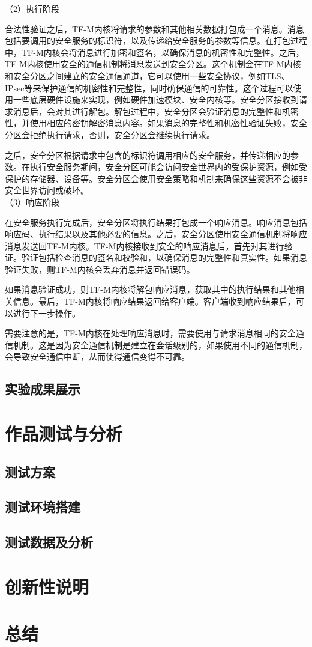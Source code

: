 \documentclass[12pt,a4paper]{ctexart}
\begin{document}
（2）执行阶段\\
\par 合法性验证之后，TF-M内核将请求的参数和其他相关数据打包成一个消息。消息包括要调用的安全服务的标识符，以及传递给安全服务的参数等信息。在打包过程中，TF-M内核会将消息进行加密和签名，以确保消息的机密性和完整性。之后，TF-M内核使用安全的通信机制将消息发送到安全分区。这个机制会在TF-M内核和安全分区之间建立的安全通信通道，它可以使用一些安全协议，例如TLS、IPsec等来保护通信的机密性和完整性，同时确保通信的可靠性。这个过程可以使用一些底层硬件设施来实现，例如硬件加速模块、安全内核等。安全分区接收到请求消息后，会对其进行解包。解包过程中，安全分区会验证消息的完整性和机密性，并使用相应的密钥解密消息内容。如果消息的完整性和机密性验证失败，安全分区会拒绝执行请求，否则，安全分区会继续执行请求。
\par 之后，安全分区根据请求中包含的标识符调用相应的安全服务，并传递相应的参数。在执行安全服务期间，安全分区可能会访问安全世界内的受保护资源，例如受保护的存储器、设备等。安全分区会使用安全策略和机制来确保这些资源不会被非安全世界访问或破坏。\\
（3）响应阶段
\par 在安全服务执行完成后，安全分区将执行结果打包成一个响应消息。响应消息包括响应码、执行结果以及其他必要的信息。之后，安全分区使用安全通信机制将响应消息发送回TF-M内核。TF-M内核接收到安全的响应消息后，首先对其进行验证。验证包括检查消息的签名和校验和，以确保消息的完整性和真实性。如果消息验证失败，则TF-M内核会丢弃消息并返回错误码。
\par 如果消息验证成功，则TF-M内核将解包响应消息，获取其中的执行结果和其他相关信息。最后，TF-M内核将响应结果返回给客户端。客户端收到响应结果后，可以进行下一步操作。
\par 需要注意的是，TF-M内核在处理响应消息时，需要使用与请求消息相同的安全通信机制。这是因为安全通信机制是建立在会话级别的，如果使用不同的通信机制，会导致安全通信中断，从而使得通信变得不可靠。

\subsection{实验成果展示}
\section{作品测试与分析}
\subsection{测试方案}
\subsection{测试环境搭建}
\subsection{测试数据及分析}
\section{创新性说明}
\section{总结}


\end{document}
